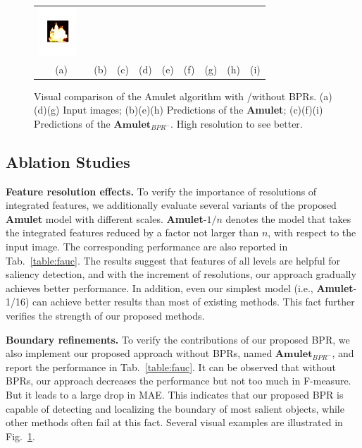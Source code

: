 \documentclass[10pt,twocolumn,letterpaper]{article}
\begin{document}
\begin{figure}
\begin{tabular}{@{}c@{}c@{}c@{}c@{}c@{}c@{}c@{}c@{}c@{}}
\includegraphics[width=0.105\linewidth,height=1.8cm]{0976_16.pdf} \ \\
{\small(a)} & {\small(b)} & {\small(c)} & {\small(d)} & {\small(e)} & {\small(f)}& {\small(g)} & {\small(h)} & {\small(i)}\\
\end{tabular}
\caption{Visual comparison of the Amulet algorithm with /without BPRs. (a)(d)(g) Input images; (b)(e)(h) Predictions of the \textbf{Amulet}; (c)(f)(i) Predictions of the $\textbf{Amulet}_{BPR^{-}}$. High resolution to see better.
\label{fig:Ablation}}
\vspace{-5mm}
\end{figure}
\setlength{\tabcolsep}{1.75pt}
\subsection{Ablation Studies}
\textbf{Feature resolution effects.} To verify the importance of resolutions of integrated features, we additionally evaluate several variants of the proposed \textbf{Amulet} model with different scales.
%
\textbf{Amulet}-$1/n$ denotes the model that takes the integrated features reduced by a factor not larger than $n$, with respect to the input image.
%
The corresponding performance are also reported in Tab.~\ref{table:fauc}.
%
The results suggest that features of all levels are helpful for saliency detection, and with the increment of resolutions, our approach gradually achieves better performance.
%
In addition, even our simplest model (i.e., \textbf{Amulet}-1/16) can achieve better results than most of existing methods.
%
This fact further verifies the strength of our proposed methods.

\textbf{Boundary refinements.}
To verify the contributions of our proposed BPR, we also implement our proposed approach without BPRs, named $\textbf{Amulet}_{BPR^{-}}$, and report the performance in Tab.~\ref{table:fauc}.
%
It can be observed that without BPRs, our approach decreases the performance but not too much in F-measure.
But it leads to a large drop in MAE. This indicates that our proposed BPR is capable of detecting and
localizing the boundary of most salient objects, while other methods often fail at this fact.
%
Several visual examples are illustrated in Fig.~\ref{fig:Ablation}.
\end{document}
